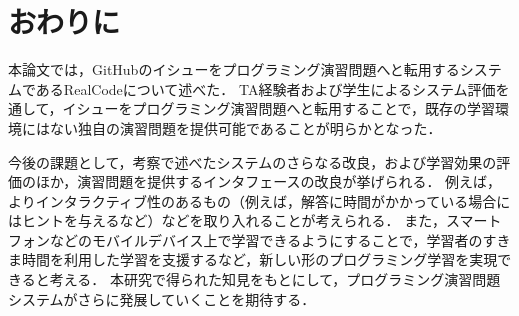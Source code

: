 \chapter{おわりに}
\graphicspath{{Chapter8/Figs/}}


本論文では，GitHubのイシューをプログラミング演習問題へと転用するシステムであるRealCodeについて述べた．
TA経験者および学生によるシステム評価を通して，イシューをプログラミング演習問題へと転用することで，既存の学習環境にはない独自の演習問題を提供可能であることが明らかとなった．

今後の課題として，考察で述べたシステムのさらなる改良，および学習効果の評価のほか，演習問題を提供するインタフェースの改良が挙げられる．
例えば，よりインタラクティブ性のあるもの（例えば，解答に時間がかかっている場合にはヒントを与えるなど）などを取り入れることが考えられる．
また，スマートフォンなどのモバイルデバイス上で学習できるようにすることで，学習者のすきま時間を利用した学習を支援するなど，新しい形のプログラミング学習を実現できると考える．
本研究で得られた知見をもとにして，プログラミング演習問題システムがさらに発展していくことを期待する．